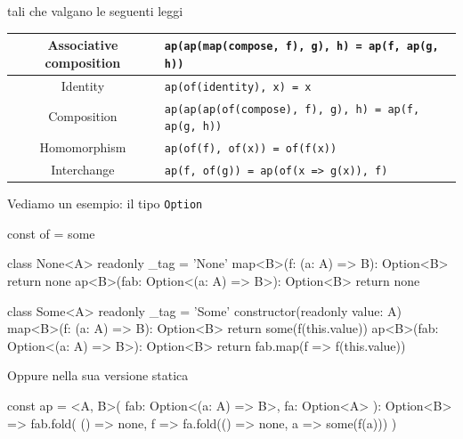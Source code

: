 \documentclass[12pt]{article}
\theoremstyle{definition}
\newenvironment{code}
  {\vspace{0.5cm} \VerbatimEnvironment\begin{typescriptcode}}
  {\end{typescriptcode} \vspace{0.2cm}}
\begin{document}
tali che valgano le seguenti leggi

\begin{center}
\bgroup
\def\arraystretch{1.5}
\begin{tabular}{ |c|p{10cm}| }
\hline
Associative composition & \texttt{ap(ap(map(compose, f), g), h) = ap(f, ap(g, h))} \\
\hline
Identity & \texttt{ap(of(identity), x) = x} \\
\hline
Composition & \texttt{ap(ap(ap(of(compose), f), g), h) = ap(f, ap(g, h))} \\
\hline
Homomorphism & \texttt{ap(of(f), of(x)) = of(f(x))} \\
\hline
Interchange & \texttt{ap(f, of(g)) = ap(of(x => g(x)), f)} \\
\hline
\end{tabular}
\egroup
\end{center}

Vediamo un esempio: il tipo \texttt{Option}

\begin{code}
const of = some

class None<A> {
  readonly _tag = 'None'
  map<B>(f: (a: A) => B): Option<B> {
    return none
  }
  ap<B>(fab: Option<(a: A) => B>): Option<B> {
    return none
  }
}

class Some<A> {
  readonly _tag = 'Some'
  constructor(readonly value: A) {}
  map<B>(f: (a: A) => B): Option<B> {
    return some(f(this.value))
  }
  ap<B>(fab: Option<(a: A) => B>): Option<B> {
    return fab.map(f => f(this.value))
  }
}
\end{code}

Oppure nella sua versione statica

\begin{code}
const ap = <A, B>(
  fab: Option<(a: A) => B>,
  fa: Option<A>
): Option<B> =>
  fab.fold(
    () => none,
    f => fa.fold(() => none, a => some(f(a)))
  )
\end{code}



\end{document}
